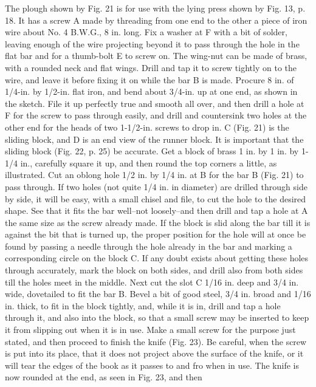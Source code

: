 \documentclass[twoside]{book}
\begin{document}
The plough shown by Fig. 21 is for use with the
lying press shown by Fig. 13, p. 18. It has a screw A
made by threading from one end to the other a piece
of iron wire about No. 4 B.W.G., 8 in. long. Fix a
washer at F with a bit of solder, leaving enough of
the wire projecting beyond it to pass through the
hole in the flat bar and for a thumb-bolt E to screw
on. The wing-nut can be made of brass, with a
rounded neck and flat wings. Drill and tap it to
screw tightly on to the wire, and leave it before
fixing it on while the bar B is made. Procure
8 in. of 1/4-in. by 1/2-in. flat iron, and bend about 3/4-in.
up at one end, as shown in the sketch. File it up
\pagebreak
perfectly true and smooth all over, and then drill
a hole at F for the screw to pass through easily,
and drill and countersink two holes at the other end
for the heads of two 1-1/2-in. screws to drop in. C
(Fig. 21) is the sliding block, and D is an end view
of the runner block. It is important that the sliding
block (Fig. 22, p. 25) be accurate. Get a block of
brass 1 in. by 1 in. by 1-1/4 in., carefully square it up,
and then round the top corners a little, as illustrated.
Cut an oblong hole 1/2 in. by 1/4 in. at B for
the bar B (Fig. 21) to pass through. If two holes
(not quite 1/4 in. in diameter) are drilled through side
by side, it will be easy, with a small chisel and file,
to cut the hole to the desired shape. See that it fits
the bar well--not loosely--and then drill and tap
a hole at A the same size as the screw already made.
If the block is slid along the bar till it is against
the bit that is turned up, the proper position for
the hole will at once be found by passing a needle
through the hole already in the bar and marking a
corresponding circle on the block C. If any doubt
exists about getting these holes through accurately,
mark the block on both sides, and drill also from
both sides till the holes meet in the middle. Next
cut the slot C 1/16 in. deep and 3/4 in. wide, dovetailed
to fit the bar B. Bevel a bit of good steel, 3/4 in.
broad and 1/16 in. thick, to fit in the block tightly,
and, while it is in, drill and tap a hole through it,
and also into the block, so that a small screw may
be inserted to keep it from slipping out when it
is in use. Make a small screw for the purpose just
stated, and then proceed to finish the knife (Fig. 23).
Be careful, when the screw is put into its place,
that it does not project above the surface of the
knife, or it will tear the edges of the book as it
passes to and fro when in use. The knife is now
rounded at the end, as seen in Fig. 23, and then
\end{document}
